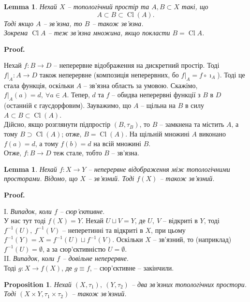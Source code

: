 \documentclass[a4paper, 10pt]{article}
\makeatletter
\theoremstyle{theoremdd}
\newtheorem{proposition}[theorem]{Proposition}
\newtheorem{lemma}[theorem]{Lemma}
\DeclareMathOperator{\Cl}{Cl}
\renewenvironment{proof}[1][Proof.\\]{\par
\pushQED{\hfill \qed}%
\normalfont \topsep6\p@\@plus6\p@\relax
\trivlist
\item\relax
{\bfseries
#1\@addpunct{.}}\hspace\labelsep\ignorespaces
}{%
\popQED\endtrivlist\@endpefalse
}
\makeatother
\begin{document}
\begin{lemma}
\label{connectedness_using_closure}
Нехай $X$ -- топологічний простір та $A,B \subset X$ такі, що \[
A \subset B \subset \Cl(A).
\]
Тоді якщо $A$ -- зв'язна, то $B$ -- також зв'язна.\\
Зокрема $\Cl A$ -- теж зв'язна множина, якщо покласти $B = \Cl A$.
\end{lemma}

\begin{proof}
Нехай $f \colon B \to D$ -- неперервне відображення на дискретний простір. Тоді $f|_A \colon A \to D$ також неперервне (композиція неперервних, бо $f|_A = f \circ \imath_A$). Тоді це стала функція, оскільки $A$ -- зв'язна область за умовою. Скажімо, $f|_A(a) = d,\  \forall a \in A$. Тепер, $d$ та $f$ -- обидва неперервні функції з $B$ в $D$ (останній є гаусдорфовим). Зауважимо, що $A$ -- щільна на $B$ в силу $A \subset B \subset \Cl(A)$. \\
Дійсно, якщо розглянути підпростір $(B,\tau_B)$, то $B$ -- замкнена та містить $A$, а тому $B \supset \Cl(A)$; отже, $B = \Cl(A)$. На щільній множині $A$ виконано $f(a) = d$, а тому $f(b) = d$ на всій множині $B$.\\
Отже, $f \colon B \to D$ теж стале, тобто $B$ -- зв'язна.
\end{proof}

\begin{lemma}
Нехай $f \colon X \to Y$ -- неперервне відображення між топологічними просторами. Відомо, що $X$ -- зв'язний. Тоді $f(X)$ -- також зв'язний.
\end{lemma}

\begin{proof}
I. \textit{Випадок, коли $f$ -- сюр'єктивне}.\\
У нас тут тоді $f(X) = Y$. Нехай $U \sqcup V = Y$, де $U,\ V$ -- відкриті в $Y$, тоді $f^{-1}(U),\ f^{-1}(V)$ -- неперетинні та відкриті в $X$, при цьому $f^{-1}(Y) = X = f^{-1}(U) \sqcup f^{-1}(V)$. Оскільки $X$ -- зв'язний, то (наприклад) $f^{-1}(U) = \emptyset$, а за сюр'єктивністю $U = \emptyset$.
\bigskip \\
II. \textit{Випадок, коли $f$ -- довільне неперервне}.\\
Тоді $g \colon X \to f(X)$, де $g \equiv f$, -- сюр'єктивне -- закінчили.
\end{proof}

\begin{proposition}
Нехай $(X,\tau_1),\ (Y,\tau_2)$ -- два зв'язних топологічних простори. Тоді $(X \times Y, \tau_1 \times \tau_2)$ -- також зв'язний.
\end{proposition}
\end{document}
